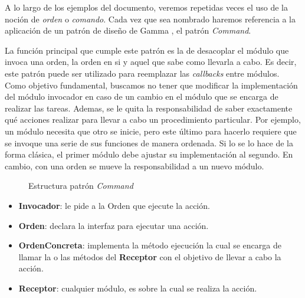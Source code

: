 A lo largo de los ejemplos del documento, veremos repetidas veces el uso de la noción de \textit{orden} o \textit{comando}. Cada vez que sea nombrado haremos referencia a la aplicación de un patrón de diseño de Gamma \cite{Gamma:1995:DPE:186897}, el patrón \textit{Command}. 

La función principal que cumple este patrón es la de desacoplar el módulo que invoca una orden, la orden en si y aquel que sabe como llevarla a cabo. Es decir, este patrón puede ser utilizado para reemplazar las \textit{callbacks} entre módulos. Como objetivo fundamental, buscamos no tener que modificar la implementación del módulo invocador en caso de un cambio en el módulo que se encarga de realizar las tareas. Ademas, se le quita la responsabilidad de saber exactamente qué acciones realizar para llevar a cabo un procedimiento particular. Por ejemplo, un módulo necesita que otro se inicie, pero este último para hacerlo requiere que se invoque una serie de sus funciones de manera ordenada. Si lo se lo hace de la forma clásica, el primer módulo debe ajustar su implementación al segundo. En cambio, con una orden se mueve la responsabilidad a un nuevo módulo.

\begin{figure}[H]
\caption{Estructura patrón \textit{Command}}
\begin{center}
\end{center}
\end{figure}

\begin{itemize}
    \item \textbf{Invocador}: le pide a la Orden que ejecute la acción.
    \item \textbf{Orden}: declara la interfaz para ejecutar una acción.
    \item \textbf{OrdenConcreta}: implementa la método ejecución la cual se encarga de llamar la o las métodos del \textbf{Receptor} con el objetivo de llevar a cabo la acción.
    \item \textbf{Receptor}: cualquier módulo, es sobre la cual se realiza la acción.
\end{itemize}

